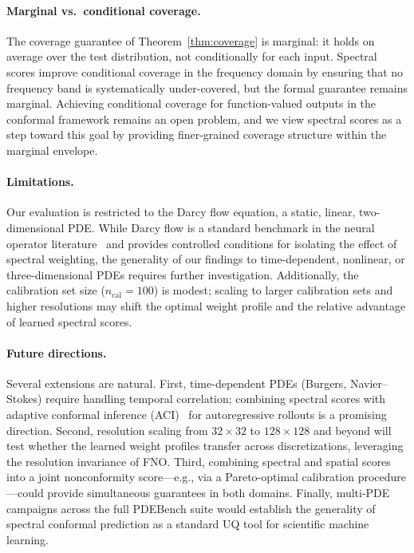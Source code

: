\paragraph{Marginal vs.\ conditional coverage.}
The coverage guarantee of Theorem~\ref{thm:coverage} is marginal: it holds on average over the test distribution, not conditionally for each input. Spectral scores improve conditional coverage in the frequency domain by ensuring that no frequency band is systematically under-covered, but the formal guarantee remains marginal. Achieving conditional coverage for function-valued outputs in the conformal framework remains an open problem, and we view spectral scores as a step toward this goal by providing finer-grained coverage structure within the marginal envelope.

\paragraph{Limitations.}
Our evaluation is restricted to the Darcy flow equation, a static, linear, two-dimensional PDE. While Darcy flow is a standard benchmark in the neural operator literature~\citep{li2021fourier,takamoto2022pdebench} and provides controlled conditions for isolating the effect of spectral weighting, the generality of our findings to time-dependent, nonlinear, or three-dimensional PDEs requires further investigation. Additionally, the calibration set size ($n_{\mathrm{cal}} = 100$) is modest; scaling to larger calibration sets and higher resolutions may shift the optimal weight profile and the relative advantage of learned spectral scores.

\paragraph{Future directions.}
Several extensions are natural. First, time-dependent PDEs (Burgers, Navier--Stokes) require handling temporal correlation; combining spectral scores with adaptive conformal inference (ACI)~\citep{gibbs2021adaptive} for autoregressive rollouts is a promising direction. Second, resolution scaling from $32 \times 32$ to $128 \times 128$ and beyond will test whether the learned weight profiles transfer across discretizations, leveraging the resolution invariance of FNO. Third, combining spectral and spatial scores into a joint nonconformity score---e.g., via a Pareto-optimal calibration procedure---could provide simultaneous guarantees in both domains. Finally, multi-PDE campaigns across the full PDEBench suite would establish the generality of spectral conformal prediction as a standard UQ tool for scientific machine learning.

